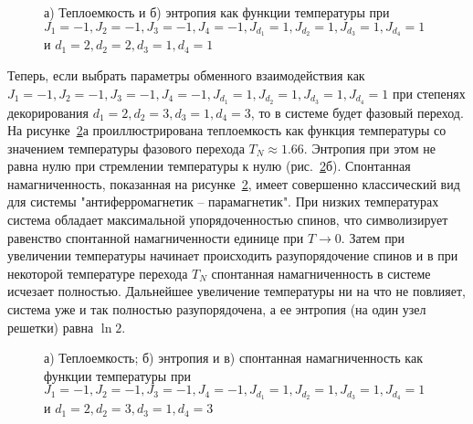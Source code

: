  \begin{figure}[h]
	\begin{minipage}{0.47\linewidth}
	\end{minipage}
	\hfill
	\begin{minipage}{0.47\linewidth}
	\end{minipage}
	\caption{а) Теплоемкость и б) энтропия как функции температуры при $J_1 = -1, J_2 = -1, J_3 = -1, J_4 = -1, J_{d_1} = 1, J_{d_2} = 1, J_{d_3} = 1, J_{d_4} = 1$ и $d_1 = 2, d_2 = 2, d_3 = 1, d_4 = 1$}
	\label{0trans}
\end{figure}

Теперь, если выбрать параметры обменного взаимодействия как $J_1 = -1, J_2 = -1, J_3 = -1, J_4 = -1, J_{d_1} = 1, J_{d_2} = 1, J_{d_3} = 1, J_{d_4} = 1$ при степенях декорирования $d_1 = 2, d_2 = 3, d_3 = 1, d_4 = 3$, то в системе будет фазовый переход. На рисунке~\ref{1trans}а проиллюстрирована теплоемкость как функция температуры со значением температуры фазового перехода $T_N \approx 1.66$. Энтропия при этом не равна нулю при стремлении температуры к нулю (рис.~\ref{1trans}б). Спонтанная намагниченность, показанная на рисунке~\ref{1trans}, имеет совершенно классический вид для системы "антиферромагнетик -- парамагнетик". При низких температурах система обладает максимальной упорядоченностью спинов, что символизирует равенство спонтанной намагниченности единице при $T \rightarrow 0$. Затем при увеличении температуры начинает происходить разупорядочение спинов и в при некоторой температуре перехода $T_N$ спонтанная намагниченность в системе исчезает полностью. Дальнейшее увеличение температуры ни на что не повлияет, система уже и так полностью разупорядочена, а ее энтропия (на один узел решетки) равна $\ln 2$.  

 \begin{figure}[h]
	\begin{minipage}{0.47\linewidth}
	\end{minipage}
	\hfill
	\begin{minipage}{0.47\linewidth}
	\end{minipage}
	\vfill
	\begin{minipage}{0.47\linewidth}
	\end{minipage}
	\caption{а) Теплоемкость; б) энтропия и в) спонтанная намагниченность как функции температуры при $J_1 = -1, J_2 = -1, J_3 = -1, J_4 = -1, J_{d_1} = 1, J_{d_2} = 1, J_{d_3} = 1, J_{d_4} = 1$ и $d_1 = 2, d_2 = 3, d_3 = 1, d_4 = 3$}
	\label{1trans}
\end{figure}

